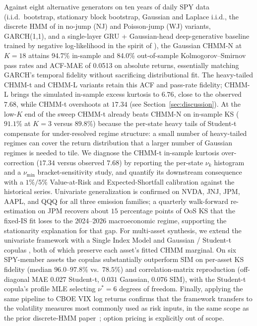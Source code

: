 Against eight alternative generators on ten years of daily SPY data (i.i.d.\ bootstrap, stationary block bootstrap, Gaussian and Laplace i.i.d., the discrete HMM of \citet{alswaidan2026hybrid} in no-jump (NJ) and Poisson-jump (WJ) variants, GARCH(1,1), and a single-layer GRU + Gaussian-head deep-generative baseline trained by negative log-likelihood in the spirit of \citet{yoon2019timegan}), the Gaussian CHMM-N at $K = 18$ attains 94.7\% in-sample and 84.0\% out-of-sample Kolmogorov--Smirnov pass rates and ACF-MAE of 0.0513 on absolute returns, essentially matching GARCH's temporal fidelity without sacrificing distributional fit.
The heavy-tailed CHMM-t and CHMM-L variants retain this ACF and pass-rate fidelity; CHMM-L brings the simulated in-sample excess kurtosis to $6.76$, close to the observed $7.68$, while CHMM-t overshoots at $17.34$ (see Section~\ref{sec:discussion}).
At the low-$K$ end of the sweep CHMM-t already beats CHMM-N on in-sample KS ($91.1\%$ at $K = 3$ versus $89.8\%$) because the per-state heavy tails of Student-t compensate for under-resolved regime structure: a small number of heavy-tailed regimes can cover the return distribution that a larger number of Gaussian regimes is needed to tile.
We diagnose the CHMM-t in-sample kurtosis over-correction ($17.34$ versus observed $7.68$) by reporting the per-state $\nu_k$ histogram and a $\nu_{\min}$ bracket-sensitivity study, and quantify its downstream consequence with a $1\%/5\%$ Value-at-Risk and Expected-Shortfall calibration against the historical series.
Univariate generalization is confirmed on NVDA, JNJ, JPM, AAPL, and QQQ for all three emission families; a quarterly walk-forward re-estimation on JPM recovers about $15$ percentage points of OoS KS that the fixed-IS fit loses to the 2024--2026 macroeconomic regime, supporting the stationarity explanation for that gap.
For multi-asset synthesis, we extend the univariate framework with a Single Index Model \cite{sharpe1963simplified} and Gaussian / Student-t copulas \cite{sklar1959fonctions, demarta2005tcopula, mcneil2015quantitative}, both of which preserve each asset's fitted CHMM marginal.
On six SPY-member assets the copulas substantially outperform SIM on per-asset KS fidelity (median $96.0$--$97.8\%$ vs.\ $78.5\%$) and correlation-matrix reproduction (off-diagonal MAE $0.027$ Student-t, $0.031$ Gaussian, $0.076$ SIM), with the Student-t copula's profile MLE selecting $\nu^{*} = 6$ degrees of freedom.
Finally, applying the same pipeline to CBOE VIX log returns confirms that the framework transfers to the volatility measures most commonly used as risk inputs, in the same scope as the prior discrete-HMM paper~\citep{alswaidan2026hybrid}; option pricing is explicitly out of scope.

